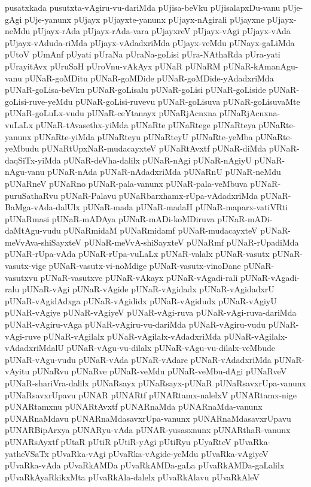 {pusatxkada
pusutxta-vAgiru-vu-dariMda
pUjisa-beVku
pUjisalapxDu-vanu
pUje-gAgi
pUje-yanunx
pUjayx
pUjayxte-yanunx
pUjayx-nAgirali
pUjayxne
pUjayx-neMdu
pUjayx-rAda
pUjayx-rAda-vara
pUjayxreV
pUjayx-vAgi
pUjayx-vAda
pUjayx-vAduda-riMda
pUjayx-vAdadxriMda
pUjayx-veMdu
pUNayx-gaLiMda
pUtoV
pUmAnf
pUyati
pUraNa
pUraNa-goLisi
pUra-NAthaRda
pUra-yati
pUrayitAvx
pUruSaH
pUroVnu-vAkAyx
pUNaR
pUNaRM
pUNaR-kAmanAgu-vanu
pUNaR-goMDitu
pUNaR-goMDide
pUNaR-goMDide-yAdadxriMda
pUNaR-goLisa-beVku
pUNaR-goLisalu
pUNaR-goLisi
pUNaR-goLiside
pUNaR-goLisi-ruve-yeMdu
pUNaR-goLisi-ruvevu
pUNaR-goLisuva
pUNaR-goLisuvaMte
pUNaR-goLuLx-vudu
pUNaR-ceYtanayx
pUNaRjAcnxna
pUNaRjAcnxna-vuLaLx
pUNaR-tAvasethx-yiMda
pUNaRte
pUNaRtege
pUNaRteya
pUNaRte-yanunx
pUNaRte-yiMda
pUNaRteyu
pUNaRteyU
pUNaRte-yeMba
pUNaRte-yeMbudu
pUNaRtUpxNaR-mudacayxteV
pUNaRtAvxtf
pUNaR-diMda
pUNaR-daqSiTx-yiMda
pUNaR-deVha-dalilx
pUNaR-nAgi
pUNaR-nAgiyU
pUNaR-nAgu-vanu
pUNaR-nAda
pUNaR-nAdadxriMda
pUNaRnU
pUNaR-neMdu
pUNaRneV
pUNaRno
pUNaR-pala-vanunx
pUNaR-pala-veMbuva
pUNaR-puruSathaRvu
pUNaR-Palavu
pUNaRbarxhamx-rUpa-vAdadxriMda
pUNaR-BaMga-vAda-dalUlx
pUNaR-mada
pUNaR-madaH
pUNaR-maparx-vatiVRti
pUNaRmasi
pUNaR-mADAya
pUNaR-mADi-koMDiruva
pUNaR-mADi-daMtAgu-vudu
pUNaRmidaM
pUNaRmidamf
pUNaR-mudacayxteV
pUNaR-meVvAva-shiSayxteV
pUNaR-meVvA-shiSayxteV
pUNaRmf
pUNaR-rUpadiMda
pUNaR-rUpa-vAda
pUNaR-rUpa-vuLaLx
pUNaR-valalx
pUNaR-vasutx
pUNaR-vasutx-vige
pUNaR-vasutx-vi-noMdige
pUNaR-vasutx-vinoDane
pUNaR-vasutxvu
pUNaR-vasutxve
pUNaR-vAkayx
pUNaR-vAgadi-rali
pUNaR-vAgadi-ralu
pUNaR-vAgi
pUNaR-vAgide
pUNaR-vAgidadx
pUNaR-vAgidadxrU
pUNaR-vAgidAdxga
pUNaR-vAgididx
pUNaR-vAgidudx
pUNaR-vAgiyU
pUNaR-vAgiye
pUNaR-vAgiyeV
pUNaR-vAgi-ruva
pUNaR-vAgi-ruva-dariMda
pUNaR-vAgiru-vAga
pUNaR-vAgiru-vu-dariMda
pUNaR-vAgiru-vudu
pUNaR-vAgi-ruve
pUNaR-vAgilalx
pUNaR-vAgilalx-vAdadxriMda
pUNaR-vAgilalx-vAdadxriMdalU
pUNaR-vAgu-vu-dilalx
pUNaR-vAgu-vu-dilalx-veMbude
pUNaR-vAgu-vudu
pUNaR-vAda
pUNaR-vAdare
pUNaR-vAdadxriMda
pUNaR-vAyitu
pUNaRvu
pUNaRve
pUNaR-veMdu
pUNaR-veMbu-dAgi
pUNaRveV
pUNaR-shariVra-dalilx
pUNaRsayx
pUNaRsayx-pUNaR
pUNaRsavxrUpa-vanunx
pUNaRsavxrUpavu
pUNAR
pUNARtf
pUNARtamx-nalelxV
pUNARtamx-nige
pUNARtamxnu
pUNARtAvxtf
pUNARnaMda
pUNARnaMda-vanunx
pUNARnaMdavu
pUNARnaMdasavxrUpa-vanunx
pUNARnaMdasavxrUpavu
pUNARBipArxya
pUNARyu-vAda
pUNAR-yusasxnunx
pUNARthaR-vanunx
pUNARsAyxtf
pUtaR
pUtiR
pUtiR-yAgi
pUtiRyu
pUyaRteV
pUvaRka-yatheVSaTx
pUvaRka-vAgi
pUvaRka-vAgide-yeMdu
pUvaRka-vAgiyeV
pUvaRka-vAda
pUvaRkAMDa
pUvaRkAMDa-gaLa
pUvaRkAMDa-gaLalilx
pUvaRkAyaRkikxMta
pUvaRkAla-dalelx
pUvaRkAlavu
pUvaRkAleV
}
